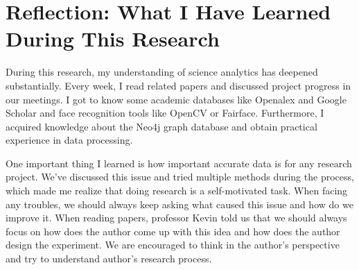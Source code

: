 \documentclass[../lab6.tex]{subfiles}
\begin{document}
\section{Reflection: What I Have Learned During This Research}
\hspace{0.5cm} During this research, my understanding of science analytics has deepened substantially. Every week, I read related papers and discussed project progress in our meetings. I got to know some academic databases like Openalex and Google Scholar and face recognition tools like OpenCV or Fairface. Furthermore, I acquired knowledge about the Neo4j graph database and obtain practical experience in data processing.
\par
One important thing I learned is how important accurate data is for any research project. We've discussed this issue and tried multiple methods during the process, which made me realize that doing research is a self-motivated task. When facing any troubles, we should always keep asking what caused this issue and how do we improve it. When reading papers, professor Kevin told us that we should always focus on how does the author come up with this idea and how does the author design the experiment. We are encouraged to think in the author's perspective and try to understand author's research process. 
\end{document}
